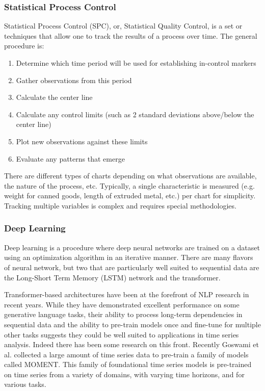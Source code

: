 \documentclass[12pt]{article}
\begin{document}
\subsubsection{Statistical Process Control}

Statistical Process Control (SPC), or, Statistical Quality Control, is a set or techniques
that allow one to track the results of a process over time\cite{guthrie_nistsematech_2020}. 
The general procedure is:

\begin{enumerate}
    \item Determine which time period will be used for establishing in-control markers
    \item Gather observations from this period
    \item Calculate the center line
    \item Calculate any control limits (such as 2 standard deviations above/below the center line)
    \item Plot new observations against these limits
    \item Evaluate any patterns that emerge
\end{enumerate}

There are different types of charts depending on what observations are available, the nature
of the process, etc. Typically, a single characteristic is measured (e.g. weight for canned goods,
length of extruded metal, etc.) per chart for simplicity. Tracking multiple variables is
complex and requires special methodologies.

\subsubsection{Deep Learning}
Deep learning is a procedure where deep neural networks are trained on a dataset using an
optimization algorithm in an iterative manner. There are many flavors of neural network, but
two that are particularly well suited to sequential data are the Long-Short Term Memory (LSTM)
network\cite{hochreiter_long_1997} and the transformer\cite{vaswani_attention_2023}.

Transformer-based architectures have been at the forefront of NLP research in recent years. While they have
demonstrated excellent performance on some generative language tasks, their ability to process long-term
dependencies in sequential data and the ability to pre-train models once and fine-tune for multiple other tasks
suggests they could be well suited to applications in time series analysis. Indeed there has been some research
on this front. Recently Goswami et al.\cite{goswami_moment_2024} collected a large amount of time series data
to pre-train a family of models called MOMENT. This family of foundational time series models is pre-trained
on time series from a variety of domains, with varying time horizons, and for various tasks.
\end{document}
